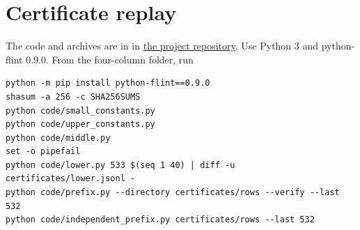 \documentclass[11pt]{article}
\begin{document}
\section{Certificate replay}
The code and archives are in 
in \href{https://github.com/ProgramComputer/open-math-research}{the project repository}.
Use Python 3 and python-flint 0.9.0. From the four-column folder, run
\begin{verbatim}
python -m pip install python-flint==0.9.0
shasum -a 256 -c SHA256SUMS
python code/small_constants.py
python code/upper_constants.py
python code/middle.py
set -o pipefail
python code/lower.py 533 $(seq 1 40) | diff -u certificates/lower.jsonl -
python code/prefix.py --directory certificates/rows --verify --last 532
python code/independent_prefix.py certificates/rows --last 532
\end{verbatim}
\end{document}
